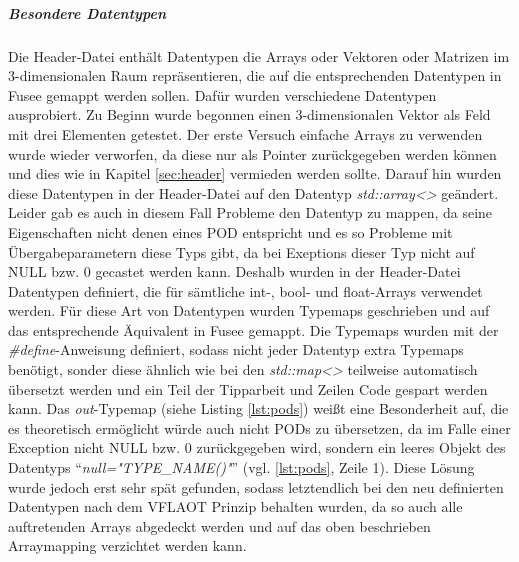 \subparagraph{Besondere Datentypen} \label{besonderedatentypen}
Die Header-Datei enthält Datentypen die Arrays oder Vektoren oder Matrizen im 3-dimensionalen Raum repräsentieren, die auf die entsprechenden Datentypen in Fusee gemappt werden sollen. Dafür wurden verschiedene Datentypen ausprobiert. Zu Beginn wurde begonnen einen 3-dimensionalen Vektor als Feld mit drei Elementen getestet. 
Der erste Versuch einfache Arrays zu verwenden wurde wieder verworfen, da diese nur als Pointer zurückgegeben werden können und dies wie in Kapitel \ref{sec:header} vermieden werden sollte. Darauf hin wurden diese Datentypen in der Header-Datei auf den Datentyp \emph{std::array<>} geändert. Leider gab es auch in diesem Fall Probleme den Datentyp zu mappen, da seine Eigenschaften nicht denen eines POD entspricht und es so Probleme mit Übergabeparametern diese Typs gibt, da bei Exeptions dieser Typ nicht auf NULL bzw. 0 gecastet werden kann.
Deshalb wurden in der Header-Datei Datentypen definiert, die für sämtliche int-, bool- und float-Arrays verwendet werden. Für diese Art von Datentypen wurden Typemaps geschrieben und auf  das entsprechende Äquivalent in Fusee gemappt. Die Typemaps wurden mit der \emph{\#define}-Anweisung definiert, sodass nicht jeder Datentyp  extra Typemaps benötigt, sonder diese ähnlich wie bei den \emph{std::map<>} teilweise automatisch übersetzt werden und ein Teil der Tipparbeit und Zeilen Code gespart werden kann.
Das \emph{out}-Typemap (siehe Listing \ref{lst:pods}) weißt eine Besonderheit auf, die es theoretisch ermöglicht würde auch nicht PODs zu übersetzen, da im Falle einer Exception nicht NULL bzw. 0 zurückgegeben wird, sondern ein leeres Objekt des Datentyps \enquote{\emph{null="TYPE\_NAME()"}} (vgl. \ref{lst:pods}, Zeile 1). Diese Lösung wurde jedoch erst sehr spät gefunden, sodass letztendlich bei den neu definierten Datentypen nach dem VFLAOT Prinzip behalten wurden, da so auch alle auftretenden Arrays abgedeckt werden und auf das oben beschrieben Arraymapping verzichtet werden kann. 
